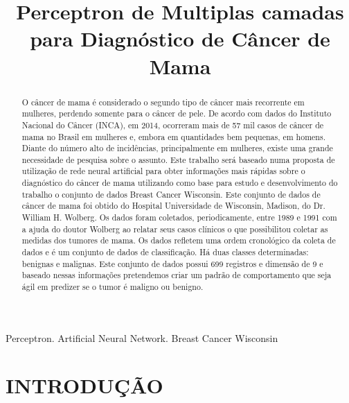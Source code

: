 \documentclass[conference]{IEEEtran}
\begin{document}
\title{Perceptron de Multiplas camadas para Diagnóstico de Câncer de Mama}

\author{
    \and
    \and
}
\maketitle

\begin{abstract}
O câncer de mama é considerado o segundo tipo de câncer mais recorrente em mulheres, perdendo somente para o câncer de pele. De acordo com dados do Instituto Nacional do Câncer (INCA), em 2014, ocorreram mais de 57 mil casos de câncer de mama no Brasil em mulheres e, embora em quantidades bem pequenas, em homens. Diante do número alto de incidências, principalmente em mulheres, existe uma grande necessidade de pesquisa sobre o assunto. Este trabalho será baseado numa proposta de utilização de rede neural artificial para obter informações mais rápidas sobre o diagnóstico do câncer de mama utilizando como base para estudo e desenvolvimento do trabalho o conjunto de dados Breast Cancer Wisconsin. Este conjunto de dados de câncer de mama foi obtido do Hospital Universidade de Wisconsin, Madison, do Dr. William H. Wolberg. Os dados foram coletados, periodicamente, entre 1989 e 1991 com a ajuda do doutor Wolberg ao relatar seus casos clínicos o que possibilitou coletar as medidas dos tumores de mama. Os dados refletem uma ordem cronológico da coleta de dados e é um conjunto de dados de classificação. Há duas classes determinadas: benignas e malignas. Este conjunto de dados possui 699 registros e dimensão de 9 e baseado nessas informações pretendemos criar um padrão de comportamento que seja ágil em predizer se o tumor é maligno ou benigno.

\end{abstract}

\begin{IEEEkeywords}
Perceptron. Artificial Neural Network. Breast Cancer Wisconsin
\end{IEEEkeywords}

\section{INTRODUÇÃO}
\end{document}

